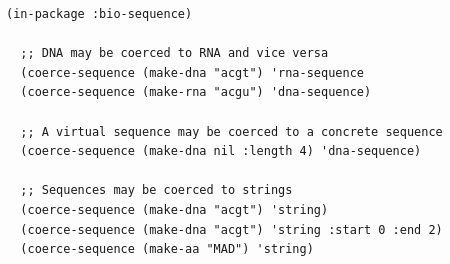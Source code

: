 \documentclass[a4paper, 12pt]{article}
\begin{document}
\begin{lstlisting}[caption={Coercing bio-sequences},
  label=lst:coercing-bioseq]
  (in-package :bio-sequence)

  ;; DNA may be coerced to RNA and vice versa
  (coerce-sequence (make-dna "acgt") 'rna-sequence
  (coerce-sequence (make-rna "acgu") 'dna-sequence)

  ;; A virtual sequence may be coerced to a concrete sequence
  (coerce-sequence (make-dna nil :length 4) 'dna-sequence)

  ;; Sequences may be coerced to strings
  (coerce-sequence (make-dna "acgt") 'string)
  (coerce-sequence (make-dna "acgt") 'string :start 0 :end 2)
  (coerce-sequence (make-aa "MAD") 'string)
\end{lstlisting}




\end{document}
